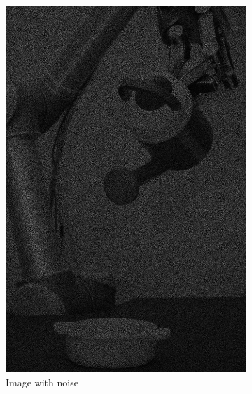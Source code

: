 \begin{figure}[H]
   \begin{subfigure}[b]{0.24\textwidth}
        \includegraphics[width=\textwidth]{img1/Image1.png}
        \caption{Image with noise}
    \end{subfigure}
    \begin{subfigure}[b]{0.24\textwidth}

\end{subfigure}
\end{figure}
